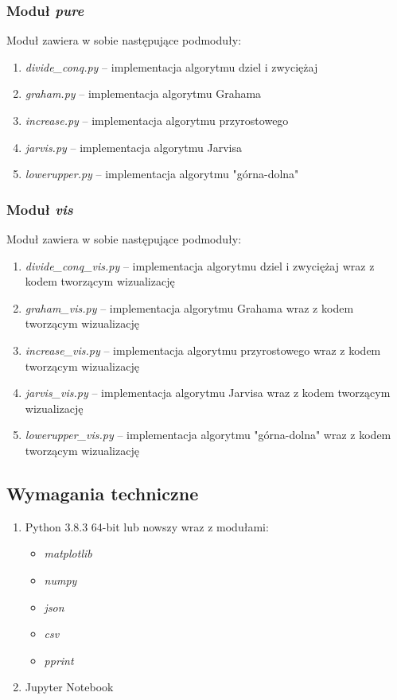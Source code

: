 \documentclass[11pt]{article}
\theoremstyle{remark} \newtheorem{definition}{def.}
\theoremstyle{definition} \newtheorem{twierdzenie}{tw.}
\begin{document}
\subsubsection{Moduł \emph{pure}}

Moduł zawiera w sobie następujące podmoduły:

\begin{enumerate}
    \item   \emph{divide\_conq.py} -- implementacja algorytmu dziel i zwyciężaj
    \item   \emph{graham.py} -- implementacja algorytmu Grahama
    \item   \emph{increase.py} -- implementacja algorytmu przyrostowego
    \item   \emph{jarvis.py} -- implementacja algorytmu Jarvisa
    \item   \emph{lowerupper.py} -- implementacja algorytmu "górna-dolna"
\end{enumerate}

\subsubsection{Moduł \emph{vis}}

Moduł zawiera w sobie następujące podmoduły:

\begin{enumerate}
    \item   \emph{divide\_conq\_vis.py} -- implementacja algorytmu dziel i zwyciężaj wraz z kodem tworzącym wizualizację
    \item   \emph{graham\_vis.py} -- implementacja algorytmu Grahama wraz z kodem tworzącym wizualizację
    \item   \emph{increase\_vis.py} -- implementacja algorytmu przyrostowego wraz z kodem tworzącym wizualizację
    \item   \emph{jarvis\_vis.py} -- implementacja algorytmu Jarvisa wraz z kodem tworzącym wizualizację
    \item   \emph{lowerupper\_vis.py} -- implementacja algorytmu "górna-dolna" wraz z kodem tworzącym wizualizację
\end{enumerate}


\subsection{Wymagania techniczne}

\begin{enumerate}
    \item   Python 3.8.3 64-bit lub nowszy wraz z modułami:
            \begin{itemize}
                \item   \emph{matplotlib}
                \item   \emph{numpy}
                \item   \emph{json}
                \item   \emph{csv}
                \item   \emph{pprint}
            \end{itemize}
    \item   Jupyter Notebook
\end{enumerate}
\end{document}

